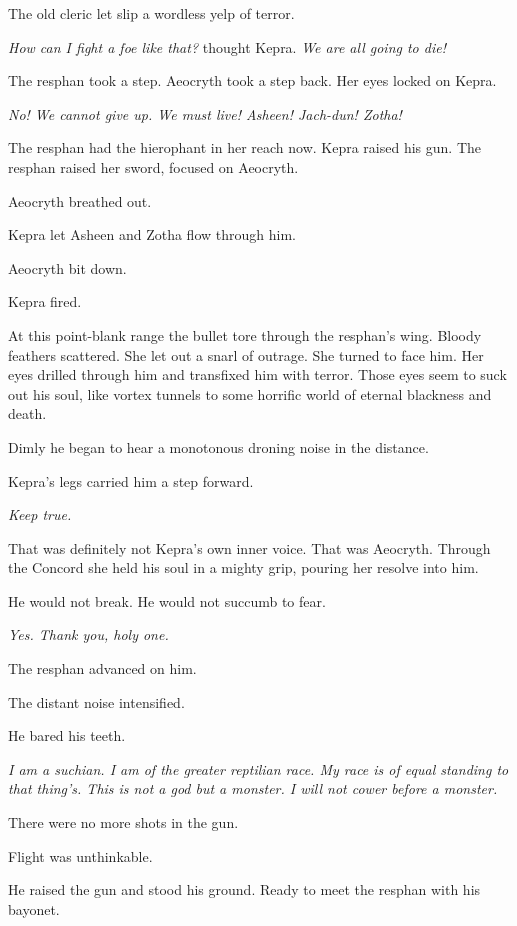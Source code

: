 \documentclass
  [a4paper,
   12pt,
   oneside
  ]%
  {article}
\begin{document}
The old cleric let slip a wordless yelp of terror.

\emph{How can I fight a foe like that?} thought Kepra. \emph{We are all going to die!}

The resphan took a step. Aeocryth took a step back. Her eyes locked on Kepra.

\emph{No! We cannot give up. We must live! Asheen! Jach-dun! Zotha!}

The resphan had the hierophant in her reach now.
Kepra raised his gun. 
The resphan raised her sword, focused on Aeocryth. 

Aeocryth breathed out. 

Kepra let Asheen and Zotha flow through him. 

Aeocryth bit down.

Kepra fired. 

At this point-blank range the bullet tore through the resphan’s wing. 
Bloody feathers scattered. 
She let out a snarl of outrage. 
She turned to face him. 
Her eyes drilled through him and transfixed him with terror. 
Those eyes seem to suck out his soul, like vortex tunnels to some horrific world of eternal blackness and death. 

Dimly he began to hear a monotonous droning noise in the distance.

Kepra's legs carried him a step forward. 

\emph{Keep true.} 

That was definitely not Kepra's own inner voice. 
That was Aeocryth. 
Through the Concord she held his soul in a mighty grip, pouring her resolve into him.

He would not break.
He would not succumb to fear.

\emph{Yes. Thank you, holy one.}

The resphan advanced on him. 

The distant noise intensified.

He bared his teeth.

\emph{%
    I am a suchian. I am of the greater reptilian race. My race is of equal standing to that thing's. This is not a god but a monster. I will not cower before a monster.}

There were no more shots in the gun. 

Flight was unthinkable.

He raised the gun and stood his ground. Ready to meet the resphan with his bayonet. 
\end{document}
